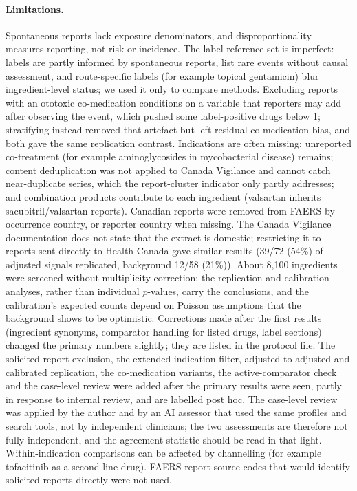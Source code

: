 \documentclass[11pt]{article}
\begin{document}
\paragraph{Limitations.} Spontaneous reports lack exposure denominators, and disproportionality measures reporting, not risk
or incidence. The label reference set is imperfect: labels are partly informed by spontaneous reports, list rare events
without causal assessment, and route-specific labels (for example topical gentamicin) blur ingredient-level status; we used it
only to compare methods. Excluding reports with an ototoxic co-medication conditions on a variable that reporters may add
after observing the event, which pushed some label-positive drugs below 1; stratifying instead removed that artefact but left
residual co-medication bias, and both gave the same replication contrast. Indications are often missing; unreported
co-treatment (for example aminoglycosides in mycobacterial disease) remains; content deduplication was not applied to Canada
Vigilance and cannot catch near-duplicate series, which the report-cluster indicator only partly addresses; and combination
products contribute to each ingredient (valsartan inherits sacubitril/valsartan reports). Canadian reports were removed from
FAERS by occurrence country, or reporter country when missing. The Canada Vigilance documentation does not state that the
extract is domestic; restricting it to reports sent directly to Health Canada gave similar results
(39/72 (54\%) of adjusted signals replicated, background
12/58 (21\%)). About 8{,}100 ingredients were screened without
multiplicity correction; the replication and calibration analyses, rather than individual $p$-values, carry the conclusions,
and the calibration's expected counts depend on Poisson assumptions that the background shows to be optimistic. Corrections
made after the first results (ingredient synonyms, comparator handling for listed drugs, label sections) changed the primary
numbers slightly; they are listed in the protocol file. The solicited-report exclusion, the extended indication filter,
adjusted-to-adjusted and calibrated replication, the co-medication variants, the active-comparator check and the case-level
review were added after the primary results were seen, partly in response to internal review, and are labelled post hoc. The
case-level review was applied by the author and by an AI assessor that used the same profiles and search tools, not by
independent clinicians; the two assessments are therefore not fully independent, and the agreement statistic should be read
in that light. Within-indication comparisons can be affected by channelling (for example tofacitinib as a second-line drug).
FAERS report-source codes that would identify solicited reports directly were not used.
\end{document}
